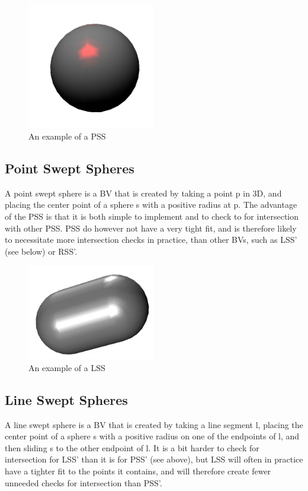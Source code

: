 \begin{figure}
\centering
\includegraphics[width=0.5\textwidth]{figures/pss}
\caption{\label{pss-example}An example of a PSS}
\end{figure}

\subsection{Point Swept Spheres}
A point swept sphere is a BV that is created by taking a point p in 3D, and placing the center point of a sphere s with a positive radius at p. The advantage of the PSS is that it is both simple to implement and to check to for intersection with other PSS. PSS do however not have a very tight fit, and is therefore likely to necessitate more intersection checks in practice, than other BVs, such as LSS' (see below) or RSS'.

\begin{figure}
\centering
\includegraphics[width=0.5\textwidth]{figures/lss}
\caption{\label{lss-example}An example of a LSS}
\end{figure}

\subsection{Line Swept Spheres}
A line swept sphere is a BV that is created by taking a line segment l, placing the center point of a sphere s with a positive radius on one of the endpoints of l, and then sliding s to the other endpoint of l. It is a bit harder to check for intersection for LSS' than it is for PSS' (see above), but LSS will often in practice have a tighter fit to the points it contains, and will therefore create fewer unneeded checks for intersection than PSS'.
